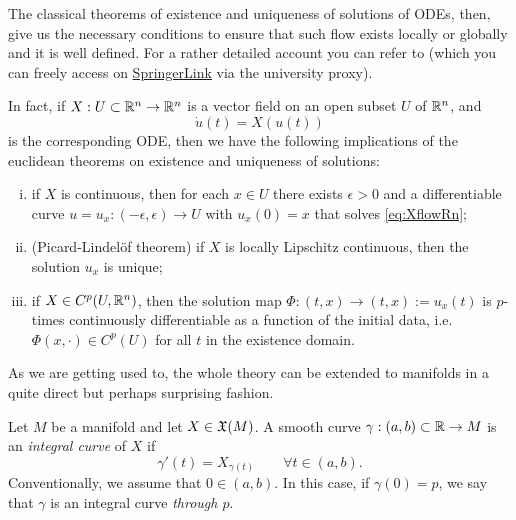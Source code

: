The classical theorems of existence and uniqueness of solutions of ODEs, then, give us the necessary conditions to ensure that such flow exists locally or globally and it is well defined.
For a rather detailed account you can refer to \cite[Chapters 3.2 and 3.3]{book:knauf} (which you can freely access on \href{https://link.springer.com/book/10.1007\%2F978-3-662-55774-7}{SpringerLink} via the university proxy).

In fact, if $X: U\subset\mathbb{R}^n \to \mathbb{R}^n$ is a vector field on an open subset $U$ of $\mathbb{R}^n$, and
\begin{equation}\label{eq:XflowRn}
  \dot u(t) = X(u(t))
\end{equation}
is the corresponding ODE, then we have the following implications of the euclidean theorems on existence and uniqueness of solutions:
\begin{enumerate}[(i)]
  \item if $X$ is continuous, then for each $x\in U$ there exists $\epsilon > 0$ and a differentiable curve $u = u_{x} : (-\epsilon, \epsilon) \to U$ with $u_x(0) = x$ that solves \eqref{eq:XflowRn};
  \item (Picard-Lindel\"of theorem) if $X$ is locally Lipschitz continuous, then the solution $u_x$ is unique;
  \item if $X\in C^p(U,\mathbb{R}^n)$, then the solution map $\Phi : (t, x) \to (t, x) := u_x (t)$ is $p$-times continuously differentiable as a function of the initial data, i.e. $\Phi(x, \cdot)\in C^p(U)$ for all $t$ in the existence domain.
\end{enumerate}

As we are getting used to, the whole theory can be extended to manifolds in a quite direct but perhaps surprising fashion.

\begin{definition}
  Let $M$ be a manifold and let $X\in\mathfrak{X}(M)$.
  A smooth curve $\gamma: (a,b)\subset\mathbb{R} \to M$ is an \emph{integral curve} of $X$ if
  \begin{equation}\label{eq:integralCurve}
    \gamma'(t) = X_{\gamma(t)} \qquad \forall t\in(a,b).
  \end{equation}
  Conventionally, we assume that $0\in(a,b)$. In this case, if $\gamma(0)=p$, we say that $\gamma$ is an integral curve \emph{through $p$}.
\end{definition}

\begin{example}
\end{example}

